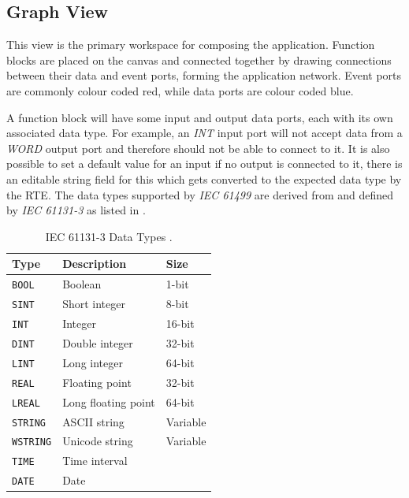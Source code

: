 \subsection{Graph View}
This view is the primary workspace for composing the application. Function blocks are placed on the canvas and connected together by drawing connections between their data and event ports, forming the application network. Event ports are commonly colour coded red, while data ports are colour coded blue.

A function block will have some input and output data ports, each with its own associated data type. For example, an \textit{INT} input port will not accept data from a \textit{WORD} output port and therefore should not be able to connect to it. It is also possible to set a default value for an input if no output is connected to it, there is an editable string field for this which gets converted to the expected data type by the \ac{RTE}. The data types supported by \textit{IEC 61499} are derived from and defined by \textit{IEC 61131-3} as listed in .

\begin{table}[H]
    \centering
    \begin{tabular}{lll}
        \hline
        \textbf{Type} & \textbf{Description} & \textbf{Size} \\
        \hline
        \texttt{BOOL}    & Boolean              & 1-bit  \\
        \texttt{SINT}    & Short integer        & 8-bit  \\
        \texttt{INT}     & Integer              & 16-bit \\
        \texttt{DINT}    & Double integer       & 32-bit \\
        \texttt{LINT}    & Long integer         & 64-bit \\
        \texttt{REAL}    & Floating point       & 32-bit \\
        \texttt{LREAL}   & Long floating point  & 64-bit \\
        \texttt{STRING}  & ASCII string         & Variable \\
        \texttt{WSTRING} & Unicode string       & Variable \\
        \texttt{TIME}    & Time interval        &        \\
        \texttt{DATE}    & Date                 &        \\
        \hline
    \end{tabular}
    \caption{IEC 61131-3 Data Types \cite{noauthor_iec_2026}.}
    \label{tab:iec-data-types}
\end{table}

